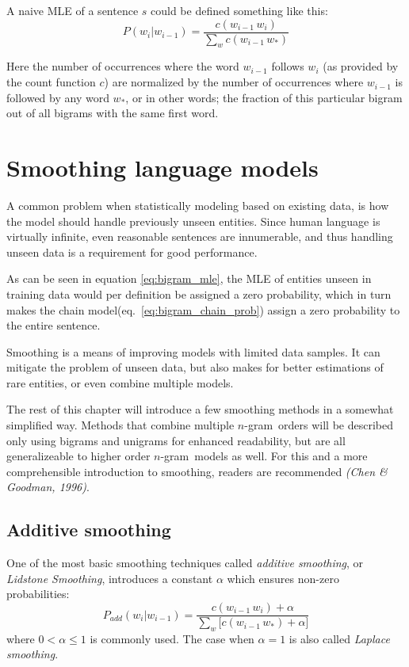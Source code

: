\documentclass[a4paper,11pt]{kth-mag}
\newcommand{\ngram}{$n$-gram}
\begin{document}
A naive \gls{MLE} of a sentence $s$ could be defined something like this:
\begin{equation} \label{eq:bigram_mle}
P(w_i|w_{i-1}) = \frac{c(w_{i-1}\,w_i)}{\sum_{w} c(w_{i-1}\, w_*)}
\end{equation}

Here the number of occurrences where the word $w_{i-1}$ follows $w_i$ (as provided by the count function $c$) are normalized by the number of occurrences where $w_{i-1}$ is followed by any word $w_*$, or in other words; the fraction of this particular bigram out of all bigrams with the same first word.

\section{Smoothing language models}
A common problem when statistically modeling based on existing data,
is how the model should handle previously unseen entities.
Since human language is virtually infinite, even reasonable sentences are innumerable,
and thus handling unseen data is a requirement for good performance.

As can be seen in equation \ref{eq:bigram_mle}, the \gls{MLE} of entities unseen in
training data would per definition be assigned a zero probability, which in turn makes
the chain model(eq.~\ref{eq:bigram_chain_prob}) assign a zero probability to the entire
sentence\cite{chen_goodman}.

Smoothing is a means of improving models with limited data samples.
It can mitigate the problem of unseen data,
but also makes for better estimations of rare entities, or even combine multiple models.

The rest of this chapter will introduce a few smoothing methods in a somewhat simplified way.
Methods that combine multiple \ngram~orders will be described only using bigrams and
unigrams for enhanced readability,
but are all generalizeable to higher order \ngram~models as well.
For this and a more comprehensible introduction to smoothing,
readers are recommended \emph{(Chen \& Goodman, 1996)}.

\subsection{Additive smoothing}
One of the most basic smoothing techniques called \emph{additive smoothing},
or \emph{Lidstone Smoothing}, introduces a constant $\alpha$ which ensures
non-zero probabilities\cite{chen_goodman}:
\begin{equation} \label{eq:additive_smoothing}
P_{add}(w_i|w_{i-1}) = \frac{c(w_{i-1}\,w_i)+\alpha}{\sum_{w} \big[c(w_{i-1}\, w_*)+\alpha\big]}
\end{equation}
where $0 < \alpha \leq 1$ is commonly used. The case when $\alpha=1$ is also called \emph{Laplace smoothing}\cite{nlp_book}.
\end{document}
